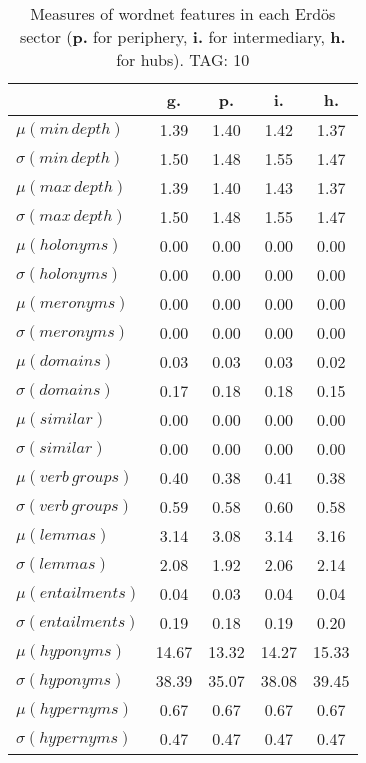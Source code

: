 \begin{table}[h!]
\begin{center}
\begin{tabular}{| l | c | c | c | c |}\hline
 & g. & p. & i. & h. \\\hline
$\mu(min\,depth)$ & 1.39  & 1.40  & 1.42  & 1.37 \\\hline
$\sigma(min\,depth)$ & 1.50  & 1.48  & 1.55  & 1.47 \\\hline
$\mu(max\,depth)$ & 1.39  & 1.40  & 1.43  & 1.37 \\\hline
$\sigma(max\,depth)$ & 1.50  & 1.48  & 1.55  & 1.47 \\\hline
$\mu(holonyms)$ & 0.00  & 0.00  & 0.00  & 0.00 \\\hline
$\sigma(holonyms)$ & 0.00  & 0.00  & 0.00  & 0.00 \\\hline
$\mu(meronyms)$ & 0.00  & 0.00  & 0.00  & 0.00 \\\hline
$\sigma(meronyms)$ & 0.00  & 0.00  & 0.00  & 0.00 \\\hline
$\mu(domains)$ & 0.03  & 0.03  & 0.03  & 0.02 \\\hline
$\sigma(domains)$ & 0.17  & 0.18  & 0.18  & 0.15 \\\hline
$\mu(similar)$ & 0.00  & 0.00  & 0.00  & 0.00 \\\hline
$\sigma(similar)$ & 0.00  & 0.00  & 0.00  & 0.00 \\\hline
$\mu(verb\,groups)$ & 0.40  & 0.38  & 0.41  & 0.38 \\\hline
$\sigma(verb\,groups)$ & 0.59  & 0.58  & 0.60  & 0.58 \\\hline
$\mu(lemmas)$ & 3.14  & 3.08  & 3.14  & 3.16 \\\hline
$\sigma(lemmas)$ & 2.08  & 1.92  & 2.06  & 2.14 \\\hline
$\mu(entailments)$ & 0.04  & 0.03  & 0.04  & 0.04 \\\hline
$\sigma(entailments)$ & 0.19  & 0.18  & 0.19  & 0.20 \\\hline
$\mu(hyponyms)$ & 14.67  & 13.32  & 14.27  & 15.33 \\\hline
$\sigma(hyponyms)$ & 38.39  & 35.07  & 38.08  & 39.45 \\\hline
$\mu(hypernyms)$ & 0.67  & 0.67  & 0.67  & 0.67 \\\hline
$\sigma(hypernyms)$ & 0.47  & 0.47  & 0.47  & 0.47 \\\hline
\end{tabular}
\caption{Measures of wordnet features in each Erd\"os sector ({{\bf p.}} for periphery, {{\bf i.}} for intermediary, {{\bf h.}} for hubs). TAG: 10}
\end{center}
\end{table}